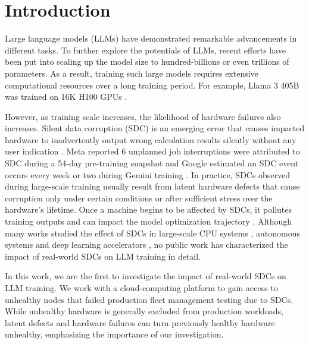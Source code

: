 \section{Introduction}

Large language models (LLMs) have demonstrated remarkable advancements in different tasks. To further explore the potentials of LLMs, recent efforts have been put into scaling up the model size to hundred-billions or even trillions of parameters. As a result, training such large models requires extensive computational resources over a long training period. For example, Llama 3 405B was trained on 16K H100 GPUs \cite{dubey2024llama3herdmodels}.

However, as training scale increases, the likelihood of hardware failures also increases. Silent data corruption (SDC) is an emerging error that causes impacted hardware to inadvertently output wrong calculation results silently without any user indication \cite{dixit2021silentdatacorruptionsscale}. Meta reported 6 unplanned job interruptions were attributed to SDC during a 54-day pre-training snapshot \cite{dubey2024llama3herdmodels} and Google estimated an SDC event occurs every week or two during Gemini training \cite{geminiteam2024geminifamilyhighlycapable}. 
In practice, SDCs observed during large-scale training usually result from latent hardware defects that cause corruption only under certain conditions or after sufficient stress over the hardware's lifetime. Once a machine begins to be affected by SDCs, it pollutes training outputs and can impact the model optimization trajectory \cite{hepermanenthardwarefailures}.
Although many works studied the effect of SDCs in large-scale CPU systems \cite{dixit2021silentdatacorruptionsscale, wang2023understandingsdc}, autonomous systems \cite{wan2022analyzing, yushunsdcrobotics2024} and deep learning accelerators \cite{zhang2018analyzing, liunderstandingerrorpropagation, rech2022reliability}, no public work has characterized the impact of real-world SDCs on LLM training in detail. 

In this work, we are the first to investigate the impact of real-world SDCs on LLM training. 
We work with a cloud-computing platform to gain access to unhealthy nodes that failed production fleet management testing due to SDCs.
While unhealthy hardware is generally excluded from production workloads, latent defects and hardware failures can turn previously healthy hardware unhealthy, emphasizing the importance of our investigation.

